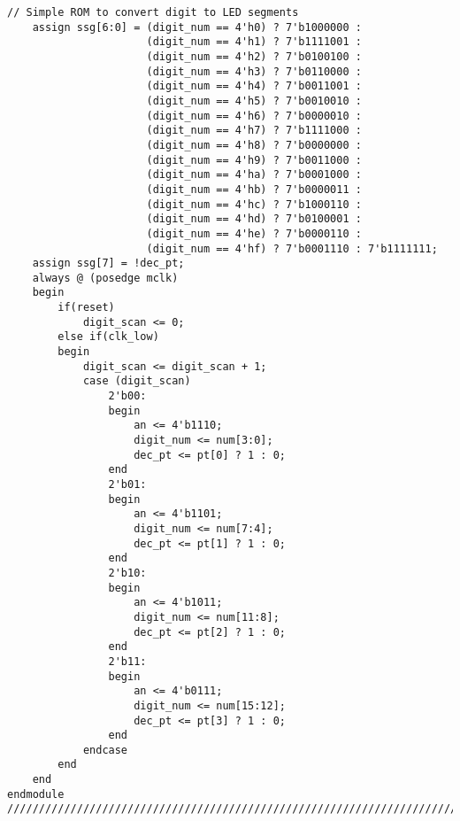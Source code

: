 \begin{lstlisting}[style=verilog-style,basicstyle=\tiny]
	// Simple ROM to convert digit to LED segments
	assign ssg[6:0] = (digit_num == 4'h0) ? 7'b1000000 :
					  (digit_num == 4'h1) ? 7'b1111001 :
					  (digit_num == 4'h2) ? 7'b0100100 :
					  (digit_num == 4'h3) ? 7'b0110000 :
					  (digit_num == 4'h4) ? 7'b0011001 :
					  (digit_num == 4'h5) ? 7'b0010010 :
					  (digit_num == 4'h6) ? 7'b0000010 :
					  (digit_num == 4'h7) ? 7'b1111000 :
					  (digit_num == 4'h8) ? 7'b0000000 :
					  (digit_num == 4'h9) ? 7'b0011000 :
					  (digit_num == 4'ha) ? 7'b0001000 :
					  (digit_num == 4'hb) ? 7'b0000011 :
					  (digit_num == 4'hc) ? 7'b1000110 :
					  (digit_num == 4'hd) ? 7'b0100001 :
					  (digit_num == 4'he) ? 7'b0000110 :
					  (digit_num == 4'hf) ? 7'b0001110 : 7'b1111111;
	assign ssg[7] = !dec_pt;
	always @ (posedge mclk)
	begin
		if(reset)
			digit_scan <= 0;
		else if(clk_low)
		begin
			digit_scan <= digit_scan + 1;
			case (digit_scan)
				2'b00:
				begin
					an <= 4'b1110;
					digit_num <= num[3:0];
					dec_pt <= pt[0] ? 1 : 0;
				end
				2'b01:
				begin
					an <= 4'b1101;
					digit_num <= num[7:4];
					dec_pt <= pt[1] ? 1 : 0;
				end
				2'b10:
				begin
					an <= 4'b1011;
					digit_num <= num[11:8];
					dec_pt <= pt[2] ? 1 : 0;
				end
				2'b11:
				begin
					an <= 4'b0111;
					digit_num <= num[15:12];
					dec_pt <= pt[3] ? 1 : 0;
				end
			endcase
		end
	end
endmodule
//////////////////////////////////////////////////////////////////////////////////
\end{lstlisting}


\newpage
